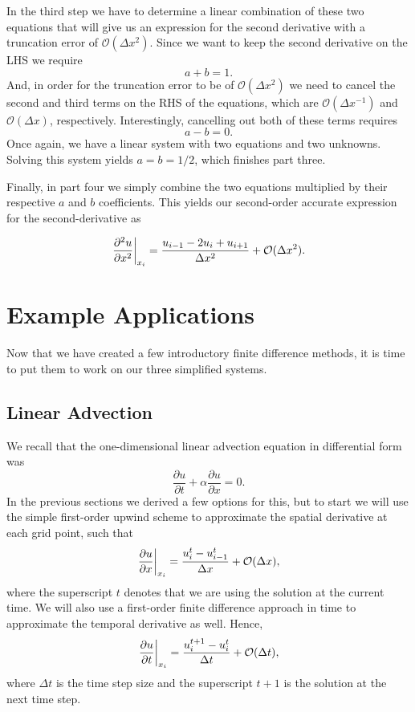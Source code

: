 In the third step we have to determine a linear combination of these two equations that will give us an expression for the second derivative with a truncation error of $\mathcal{O}(\Delta x^2)$. Since we want to keep the second derivative on the LHS we require
\begin{equation}
	a + b = 1.
\end{equation}
And, in order for the truncation error to be of $\mathcal{O}(\Delta x^2)$ we need to cancel the second and third terms on the RHS of the equations, which are $\mathcal{O}(\Delta x^{-1})$ and $\mathcal{O}(\Delta x)$, respectively. Interestingly, cancelling out both of these terms requires
\begin{equation}
	a - b = 0.
\end{equation}
Once again, we have a linear system with two equations and two unknowns. Solving this system yields $a=b=1/2$, which finishes part three.

Finally, in part four we simply combine the two equations multiplied by their respective $a$ and $b$ coefficients. This yields our second-order accurate expression for the second-derivative as
\begin{eqBox}
\begin{equation}
	\left.\frac{\partial^2 u}{\partial x^2}\right\rvert_{x_i}^{} = \frac{u_{i-1} - 2u_i + u_{i+1}}{\Delta x^2} + \mathcal{O}(\Delta x^2).
\end{equation}
\end{eqBox}

\section{Example Applications}
Now that we have created a few introductory finite difference methods, it is time to put them to work on our three simplified systems.
\subsection{Linear Advection}
We recall that the one-dimensional linear advection equation in differential form was
\begin{equation}
	\frac{\partial u}{\partial t} +  \alpha \frac{\partial u}{\partial x} = 0.
\end{equation}
In the previous sections we derived a few options for this, but to start we will use the simple first-order upwind scheme to approximate the spatial derivative at each grid point, such that
\begin{equation}
	\left.\frac{\partial u}{\partial x}\right\rvert_{x_i}^{} = \frac{u_i^t - u_{i-1}^t}{\Delta x} + \mathcal{O}(\Delta x),
\end{equation}
where the superscript $t$ denotes that we are using the solution at the current time. We will also use a first-order finite difference approach in time to approximate the temporal derivative as well. Hence,
\begin{equation}
	\left.\frac{\partial u}{\partial t}\right\rvert_{x_i}^{} = \frac{u_i^{t+1} - u_{i}^t}{\Delta t} + \mathcal{O}(\Delta t),
\end{equation}
where $\Delta t$ is the time step size and the superscript $t+1$ is the solution at the next time step.

